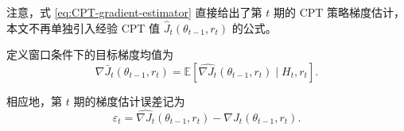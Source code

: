 注意，式 \eqref{eq:CPT-gradient-estimator} 直接给出了第 $t$ 期的 CPT 策略梯度估计，本文不再单独引入经验 CPT 值 $\widehat J_t(\theta_{t-1},r_t)$ 的公式。

定义窗口条件下的目标梯度均值为
\begin{equation}
\nabla \bar J_t(\theta_{t-1},r_t)
=
\mathbb E
\!\left[
\widehat{\nabla J_t}(\theta_{t-1},r_t)
\mid H_t,r_t
\right].
\end{equation}

相应地，第 $t$ 期的梯度估计误差记为
\begin{equation}
\varepsilon_t
=
\widehat{\nabla J_t}(\theta_{t-1},r_t)
-
\nabla J_t(\theta_{t-1},r_t).
\end{equation}